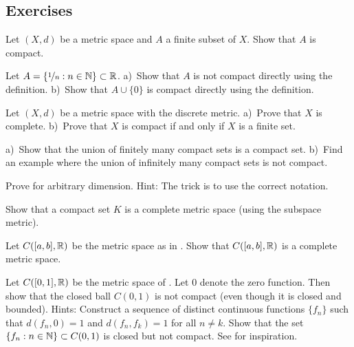 \subsection{Exercises}

\begin{exercise}
Let $(X,d)$ be a metric space and $A$ a finite subset of $X$.
Show that $A$ is compact.
\end{exercise}

\begin{exercise}
Let $A = \{ \nicefrac{1}{n} : n \in {\mathbb{N}} \} \subset {\mathbb{R}}$.  a)~Show that $A$ is
not compact directly using the definition.  b)~Show that $A \cup \{ 0 \}$ is
compact directly using the definition.
\end{exercise}


\begin{exercise}
Let $(X,d)$ be a metric space with the discrete metric.  a)~Prove that
$X$ is complete.  b)~Prove that $X$ is compact if and only if $X$ is a finite
set.
\end{exercise}

\begin{exercise}
a)~Show that the union of finitely many compact sets is a compact set.
b)~Find an example where the union of infinitely many compact sets is not
compact.
\end{exercise}

\begin{exercise}
Prove  for arbitrary dimension.
Hint: The trick is to use the correct notation.
\end{exercise}

\begin{exercise}
Show that a compact set $K$ is a complete metric space (using the subspace
metric).
\end{exercise}

\begin{exercise} \label{exercise:CabRcomplete}
Let $C([a,b],{\mathbb{R}})$ be the metric space as in .  Show that
$C([a,b],{\mathbb{R}})$ is a complete metric space.
\end{exercise}

\begin{exercise}[Challenging] \label{exercise:msclbounnotcompt}
Let $C([0,1],{\mathbb{R}})$ be the metric space of .  Let $0$
denote the zero function.  Then show that the closed ball
$C(0,1)$ is not compact (even though it is closed and bounded).
Hints: Construct a sequence of distinct continuous functions $\{ f_n \}$ such that
$d(f_n,0) = 1$ and $d(f_n,f_k) = 1$ for all $n \not= k$.  Show that
the set $\{ f_n : n \in {\mathbb{N}} \} \subset C(0,1)$ is closed but not compact.
See  for inspiration.
\end{exercise}

